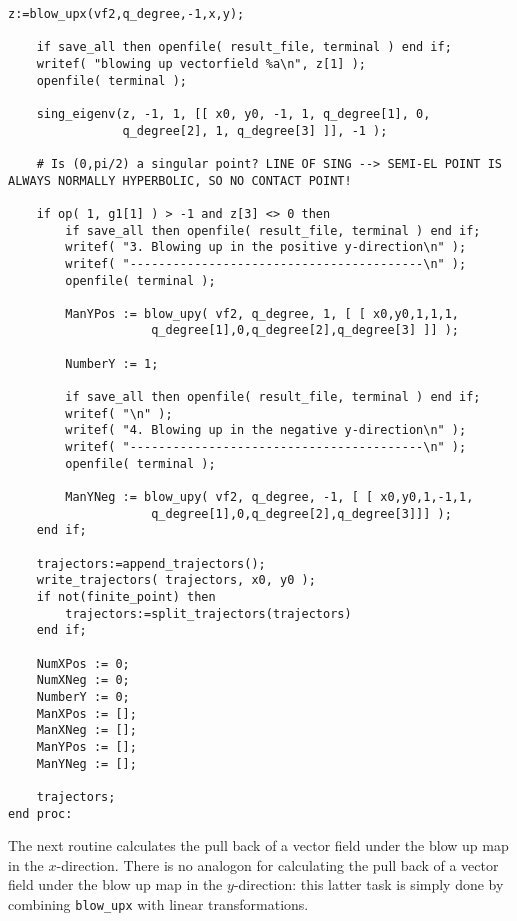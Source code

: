 \documentclass[a4paper,10pt]{article}
\begin{document}
\begin{lstlisting}[name=blowup]
    z:=blow_upx(vf2,q_degree,-1,x,y);

    if save_all then openfile( result_file, terminal ) end if;
    writef( "blowing up vectorfield %a\n", z[1] );
    openfile( terminal );

    sing_eigenv(z, -1, 1, [[ x0, y0, -1, 1, q_degree[1], 0,
                q_degree[2], 1, q_degree[3] ]], -1 );

    # Is (0,pi/2) a singular point? LINE OF SING --> SEMI-EL POINT IS ALWAYS NORMALLY HYPERBOLIC, SO NO CONTACT POINT!

    if op( 1, g1[1] ) > -1 and z[3] <> 0 then
        if save_all then openfile( result_file, terminal ) end if;
        writef( "3. Blowing up in the positive y-direction\n" );
        writef( "-----------------------------------------\n" );
        openfile( terminal );

        ManYPos := blow_upy( vf2, q_degree, 1, [ [ x0,y0,1,1,1,
                    q_degree[1],0,q_degree[2],q_degree[3] ]] );

        NumberY := 1;

        if save_all then openfile( result_file, terminal ) end if;
        writef( "\n" );
        writef( "4. Blowing up in the negative y-direction\n" );
        writef( "-----------------------------------------\n" );
        openfile( terminal );

        ManYNeg := blow_upy( vf2, q_degree, -1, [ [ x0,y0,1,-1,1,
                    q_degree[1],0,q_degree[2],q_degree[3]]] );
    end if;

    trajectors:=append_trajectors();
    write_trajectors( trajectors, x0, y0 );
    if not(finite_point) then
        trajectors:=split_trajectors(trajectors)
    end if;

    NumXPos := 0;
    NumXNeg := 0;
    NumberY := 0;
    ManXPos := [];
    ManXNeg := [];
    ManYPos := [];
    ManYNeg := [];

    trajectors;
end proc:
\end{lstlisting}

The next routine calculates the pull back of a vector field under the blow up map in the $x$-direction.
There is no analogon for calculating the pull back of a vector field under the blow up map in the $y$-direction:
this latter task is simply done by combining \verb+blow_upx+ with linear transformations.
\end{document}
